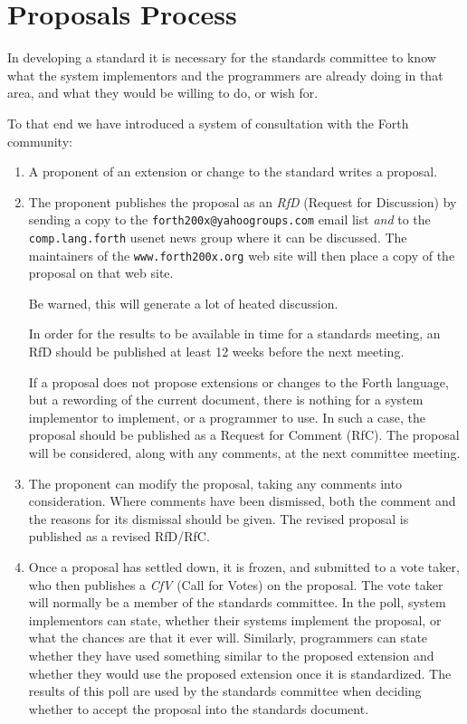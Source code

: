
\chapter*{Proposals Process}
\label{process}

In developing a standard it is necessary for the standards committee to
know what the system implementors and the programmers are already doing
in that area, and what they would be willing to do, or wish for.

To that end we have introduced a system of consultation with the Forth
community:

\begin{enumerate}
\item
	A proponent of an extension or change to the standard writes a
	proposal.

\item
	The proponent publishes the proposal as an \emph{RfD} (Request for
	Discussion) by sending a copy to the \texttt{forth200x@yahoogroups.com}
	email list \emph{and} to the \texttt{comp.lang.forth} usenet news group
	where it can be discussed.  The maintainers of the
	\texttt{www.forth200x.org} web site will then place a copy of the
	proposal on that web site.

	Be warned, this will generate a lot of heated discussion.

	In order for the results to be available in time for a standards
	meeting, an RfD should be published at least 12 weeks before the
	next meeting.

	If a proposal does not propose extensions or changes to the Forth
	language, but a rewording of the current document, there is nothing
	for a system implementor to implement, or a programmer to use.  In
	such a case, the proposal should be published as a Request for Comment
	(RfC). The proposal will be considered, along with any comments, at
	the next committee meeting.

\item
	The proponent can modify the proposal, taking any comments into
	consideration.  Where comments have been dismissed, both the comment 
	and the reasons for its dismissal should be given.  The revised
	proposal is published as a revised RfD/RfC.

\item
	Once a proposal has settled down, it is frozen, and submitted to a
	vote taker, who then publishes a \emph{CfV} (Call for Votes) on the
	proposal. The vote taker will normally be a member of the standards
	committee.  In the poll, system implementors can state, whether
	their systems implement the proposal, or what the chances are that
	it ever will.  Similarly, programmers can state whether they have
	used something similar to the proposed extension and whether they
	would use the proposed extension once it is standardized.  The
	results of this poll are used by the standards committee when
	deciding whether to accept the proposal into the standards document.


\end{enumerate}

